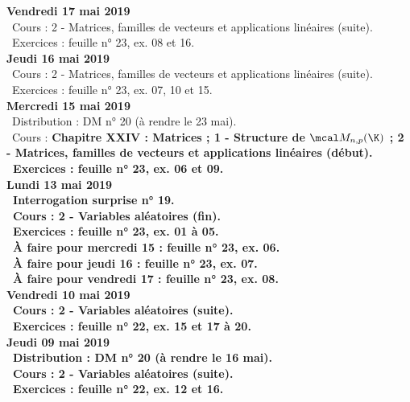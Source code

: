 \documentclass[12pt,a4paper]{article}
\begin{document}
\noindent\textbf{Vendredi 17 mai 2019}\\
\bu\ Cours : 2 - Matrices, familles de vecteurs et applications linéaires (suite).\\
\bu\ Exercices : feuille n° 23, ex. 08 et 16.\vspace{.4cm}\\

\noindent\textbf{Jeudi 16 mai 2019}\\
\bu\ Cours : 2 - Matrices, familles de vecteurs et applications linéaires (suite).\\
\bu\ Exercices : feuille n° 23, ex. 07, 10 et 15.\vspace{.4cm}\\

\noindent\textbf{Mercredi 15 mai 2019}\\
\bu\ Distribution : DM n° 20 (à rendre le 23 mai).\\
\bu\ Cours : \bf Chapitre XXIV \rm : Matrices ; 1 - Structure de $\mcal M_{n,p}(\K)$ ; 2 - Matrices, familles de 
vecteurs et applications linéaires (début).\\
\bu\ Exercices : feuille n° 23, ex. 06 et 09.\vspace{.4cm}\\

\noindent\textbf{Lundi 13 mai 2019}\\
\bu\ Interrogation surprise n° 19.\\
\bu\ Cours : 2 - Variables aléatoires (fin).\\
\bu\ Exercices : feuille n° 23, ex. 01 à 05.\\
\bu\ À faire pour mercredi 15 : feuille n° 23, ex. 06.\\
\bu\ À faire pour jeudi 16 : feuille n° 23, ex. 07.\\
\bu\ À faire pour vendredi 17 : feuille n° 23, ex. 08.\vspace{.4cm}\\

\noindent\textbf{Vendredi 10 mai 2019}\\
\bu\ Cours : 2 - Variables aléatoires (suite).\\
\bu\ Exercices : feuille n° 22, ex. 15 et 17 à 20.\vspace{.4cm}\\

\noindent\textbf{Jeudi 09 mai 2019}\\
\bu\ Distribution : DM n° 20 (à rendre le 16 mai).\\
\bu\ Cours : 2 - Variables aléatoires (suite).\\
\bu\ Exercices : feuille n° 22, ex. 12 et 16.\vspace{.4cm}\\
\end{document}
